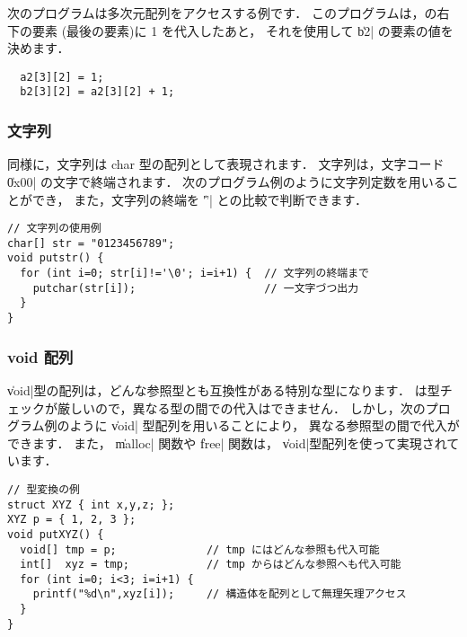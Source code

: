 次のプログラムは多次元配列をアクセスする例です．
このプログラムは，の右下の要素
(最後の要素)に 1 を代入したあと，
それを使用して \|b2| の要素の値を決めます．

\begin{mylist}
\begin{verbatim}
  a2[3][2] = 1;
  b2[3][2] = a2[3][2] + 1;
\end{verbatim}
\end{mylist}

\subsubsection{文字列}

\cl 同様に，文字列は char 型の配列として表現されます．
文字列は，文字コード \|0x00| の文字で終端されます．
次のプログラム例のように文字列定数を用いることができ，
また，文字列の終端を \|'\0'| との比較で判断できます．

\begin{mylist}
\begin{verbatim}
// 文字列の使用例
char[] str = "0123456789";
void putstr() {
  for (int i=0; str[i]!='\0'; i=i+1) {  // 文字列の終端まで
    putchar(str[i]);                    // 一文字づつ出力
  }
}
\end{verbatim}
\end{mylist}

\subsubsection{ void 配列}

\|void|型の配列は，どんな参照型とも互換性がある特別な型になります．
\cmml は型チェックが厳しいので，異なる型の間での代入はできません．
しかし，次のプログラム例のように \|void| 型配列を用いることにより，
異なる参照型の間で代入ができます．
また， \|malloc| 関数や \|free| 関数は，
\|void|型配列を使って実現されています．

\begin{mylist}
\begin{verbatim}
// 型変換の例
struct XYZ { int x,y,z; };
XYZ p = { 1, 2, 3 };
void putXYZ() {
  void[] tmp = p;              // tmp にはどんな参照も代入可能
  int[]  xyz = tmp;            // tmp からはどんな参照へも代入可能
  for (int i=0; i<3; i=i+1) {
    printf("%d\n",xyz[i]);     // 構造体を配列として無理矢理アクセス
  }
}
\end{verbatim}
\end{mylist}

